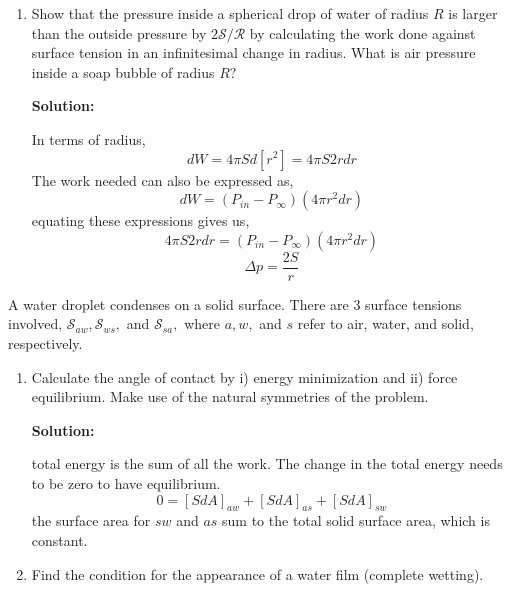 \documentclass[10pt]{article}
\newenvironment{Solution}
    {\textbf{Solution:}
    
    \vspace{5mm}
    \begin{tcolorbox}
    }
    {
    \end{tcolorbox}
    \vspace{5mm}
    }
\begin{document}
\begin{enumerate}
\begin{enumerate}

\item Show that the pressure inside a spherical drop of water of radius $R$ is larger than the outside pressure by $2 \mathcal{S} / \mathcal{R}$ by calculating the work done against surface tension in an infinitesimal change in radius. What is air pressure inside a soap bubble of radius $R ?$

\begin{Solution}
In terms of radius,
\begin{equation}
    d W = 4\pi S d\left[r^2\right] =4\pi S 2r dr 
\end{equation}
The work needed can also be expressed as, 
\begin{equation}
    dW = (P_{in}-P_\infty ) (4\pi r^2 dr)
\end{equation}
equating these expressions gives us,
\begin{equation}
    4\pi S 2r dr = (P_{in}-P_{\infty} ) (4\pi r^2 dr)
\end{equation}
\begin{equation}
    \boxed{\Delta p = \frac{2S}{r}}
\end{equation}
\end{Solution}

\end{enumerate}

A water droplet condenses on a solid surface. There are 3 surface tensions involved, $\mathcal{S}_{a w}, \mathcal{S}_{w s},$ and $\mathcal{S}_{s a},$ where $a, w,$ and $s$ refer to air, water, and solid, respectively.
\begin{enumerate}[resume]


\item Calculate the angle of contact by i) energy minimization and ii) force equilibrium. Make use of the natural symmetries of the problem.
 

\begin{Solution}
total energy is the sum of all the work. The change in the total energy needs to be zero to have equilibrium. 
\begin{equation}
    0 = [SdA]_{aw} +[SdA]_{as} +[SdA]_{sw}
\end{equation}
the surface area for $sw$ and $as$ sum to the total solid surface area, which is constant. 
\end{Solution}

\item Find the condition for the appearance of a water film (complete wetting).



\end{enumerate}
\end{enumerate}
\end{document}
